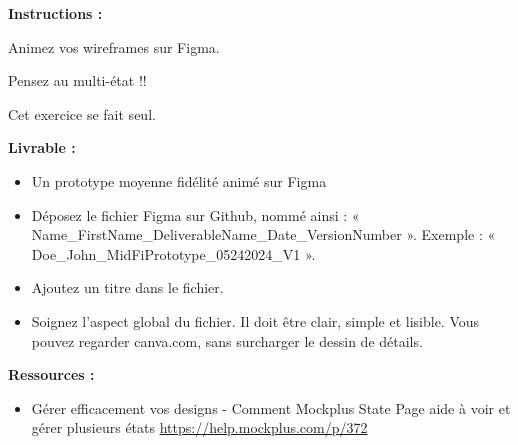 \makeheaderfiles

\textbf{Instructions :}

Animez vos wireframes sur Figma.

Pensez au multi-état !!

Cet exercice se fait seul.

\textbf{Livrable :}

\begin{itemize}
\item Un prototype moyenne fidélité animé sur Figma
\item Déposez le fichier Figma sur Github, nommé ainsi : « Name\_FirstName\_DeliverableName\_Date\_VersionNumber ». Exemple : « Doe\_John\_MidFiPrototype\_05242024\_V1 ».
\item Ajoutez un titre dans le fichier.
\item Soignez l'aspect global du fichier. Il doit être clair, simple et lisible. Vous pouvez regarder canva.com, sans surcharger le dessin de détails.
\end{itemize}

\textbf{Ressources :}

\begin{itemize}
\item Gérer efficacement vos designs - Comment Mockplus State Page aide à voir et gérer plusieurs états \url{https://help.mockplus.com/p/372}
\end{itemize}

